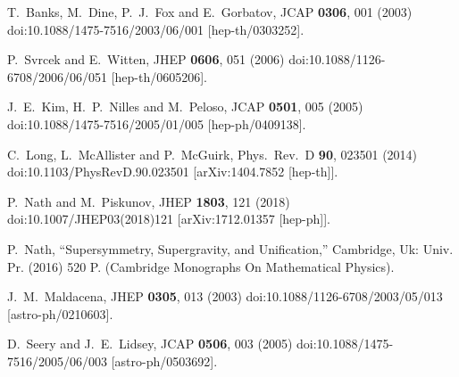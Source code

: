 \documentclass[a4paper,11pt]{article}
\begin{document}
\begin{thebibliography}{99}
  T.~Banks, M.~Dine, P.~J.~Fox and E.~Gorbatov,
  JCAP {\bf 0306}, 001 (2003)
  doi:10.1088/1475-7516/2003/06/001
  [hep-th/0303252].


  P.~Svrcek and E.~Witten,
  JHEP {\bf 0606}, 051 (2006)
  doi:10.1088/1126-6708/2006/06/051
  [hep-th/0605206].


  J.~E.~Kim, H.~P.~Nilles and M.~Peloso,
  JCAP {\bf 0501}, 005 (2005)
  doi:10.1088/1475-7516/2005/01/005
  [hep-ph/0409138].


  C.~Long, L.~McAllister and P.~McGuirk,
  Phys.\ Rev.\ D {\bf 90}, 023501 (2014)
  doi:10.1103/PhysRevD.90.023501
  [arXiv:1404.7852 [hep-th]].


  P.~Nath and M.~Piskunov,
  JHEP {\bf 1803}, 121 (2018)
  doi:10.1007/JHEP03(2018)121
  [arXiv:1712.01357 [hep-ph]].


  P.~Nath,
  ``Supersymmetry, Supergravity, and Unification,''
   Cambridge, Uk: Univ. Pr. (2016) 520 P. (Cambridge Monographs On Mathematical Physics).


  J.~M.~Maldacena,
  JHEP {\bf 0305}, 013 (2003)
  doi:10.1088/1126-6708/2003/05/013
  [astro-ph/0210603].


  D.~Seery and J.~E.~Lidsey,
  JCAP {\bf 0506}, 003 (2005)
  doi:10.1088/1475-7516/2005/06/003
  [astro-ph/0503692].



\end{thebibliography}
\end{document}
